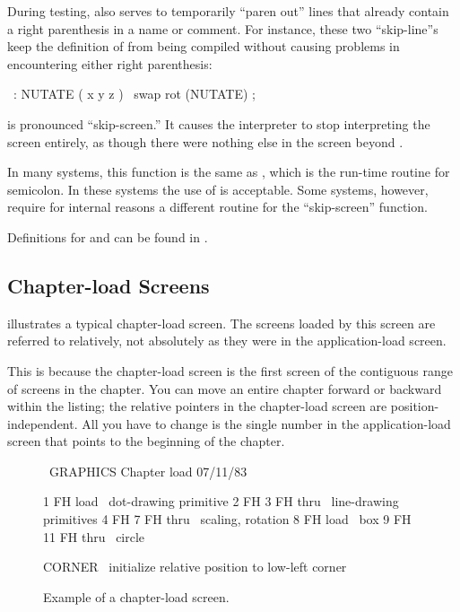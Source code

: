 During testing, \forth{\bs} also serves to temporarily ``paren out''
lines that already contain a right parenthesis in a name or comment.
For instance, these two ``skip-line''s keep the definition of
 from being compiled without causing problems in
encountering either right parenthesis:
\begin{Code}
\ : NUTATE  ( x y z )
\   swap rot  (NUTATE) ;
\end{Code}
 is pronounced ``skip-screen.'' It causes the \Forth{}
interpreter to stop interpreting the screen entirely, as though there
were nothing else in the screen beyond .

In many \Forth{} systems, this function is the same as
, which is the run-time routine for
semicolon.  In these systems the use of  is acceptable.
Some \Forth{} systems, however, require for internal reasons a
different routine for the ``skip-screen'' function.

Definitions for \forthb{\bs} and  can be found in .%

\subsection{Chapter-load Screens}%
%

 illustrates a typical chapter-load screen.  The screens
loaded by this screen are referred to relatively, not absolutely as
they were in the application-load screen.

This is because the chapter-load screen is the first screen of the
contiguous range of screens in the chapter.  You can move an entire
chapter forward or backward within the listing; the relative pointers
in the chapter-load screen are position-independent.  All you have to
change is the single number in the application-load screen that points
to the beginning of the chapter.

\begin{figure*}
\caption{Example of a chapter-load screen.}

\setcounter{screen}{100}
\begin{Screen}
\ GRAPHICS                 Chapter load                 07/11/83

 1 FH load            \ dot-drawing primitive
 2 FH 3 FH thru       \ line-drawing primitives
 4 FH 7 FH thru       \ scaling, rotation
 8 FH load            \ box
 9 FH 11 FH thru      \ circle



CORNER  \ initialize relative position to low-left corner





\end{Screen}
\end{figure*}

